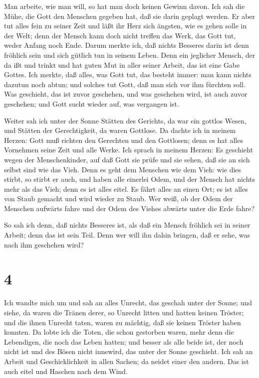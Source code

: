  Man arbeite, wie man will, so hat man doch keinen Gewinn
davon.  Ich sah die Mühe, die Gott den Menschen gegeben
hat, daß sie darin geplagt werden.  Er aber tut alles fein
zu seiner Zeit und läßt ihr Herz sich ängsten, wie es gehen solle in der
Welt; denn der Mensch kann doch nicht treffen das Werk, das Gott tut,
weder Anfang noch Ende.  Darum merkte ich, daß nichts
Besseres darin ist denn fröhlich sein und sich gütlich tun in seinem
Leben.  Denn ein jeglicher Mensch, der da ißt und trinkt
und hat guten Mut in aller seiner Arbeit, das ist eine Gabe Gottes.
 Ich merkte, daß alles, was Gott tut, das besteht immer:
man kann nichts dazutun noch abtun; und solches tut Gott, daß man sich
vor ihm fürchten soll.  Was geschieht, das ist zuvor
geschehen, und was geschehen wird, ist auch zuvor geschehen; und Gott
sucht wieder auf, was vergangen ist.

 Weiter sah ich unter der Sonne Stätten des Gerichts, da
war ein gottlos Wesen, und Stätten der Gerechtigkeit, da waren Gottlose.
 Da dachte ich in meinem Herzen: Gott muß richten den
Gerechten und den Gottlosen; denn es hat alles Vornehmen seine Zeit und
alle Werke.  Ich sprach in meinem Herzen: Es geschieht
wegen der Menschenkinder, auf daß Gott sie prüfe und sie sehen, daß sie
an sich selbst sind wie das Vieh.  Denn es geht dem
Menschen wie dem Vieh: wie dies stirbt, so stirbt er auch, und haben
alle einerlei Odem, und der Mensch hat nichts mehr als das Vieh; denn es
ist alles eitel.  Es fährt alles an einen Ort; es ist alles
von Staub gemacht und wird wieder zu Staub.  Wer weiß, ob
der Odem der Menschen aufwärts fahre und der Odem des Viehes abwärts
unter die Erde fahre?

 So sah ich denn, daß nichts Besseres ist, als daß ein
Mensch fröhlich sei in seiner Arbeit; denn das ist sein Teil. Denn wer
will ihn dahin bringen, daß er sehe, was nach ihm geschehen wird?

\hypertarget{section-3}{%
\section{4}\label{section-3}}

 Ich wandte mich um und sah an alles Unrecht, das geschah
unter der Sonne; und siehe, da waren die Tränen derer, so Unrecht litten
und hatten keinen Tröster; und die ihnen Unrecht taten, waren zu
mächtig, daß sie keinen Tröster haben konnten.  Da lobte ich
die Toten, die schon gestorben waren, mehr denn die Lebendigen, die noch
das Leben hatten;  und besser als alle beide ist, der noch
nicht ist und des Bösen nicht innewird, das unter der Sonne geschieht.
 Ich sah an Arbeit und Geschicklichkeit in allen Sachen; da
neidet einer den andern. Das ist auch eitel und Haschen nach dem Wind.

